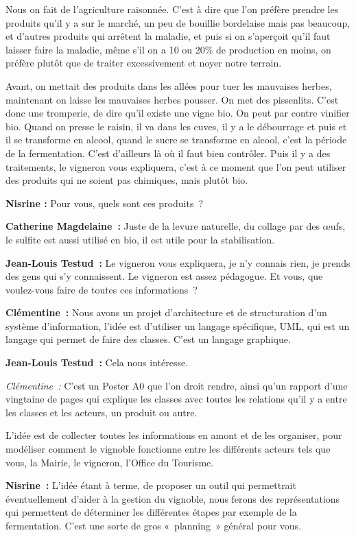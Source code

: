 \documentclass[a4paper, titlepage]{report}
\begin{document}
Nous on fait de l'agriculture raisonnée. C'est à dire que l'on préfère
prendre les produits qu'il y a sur le marché, un peu de bouillie
bordelaise mais pas beaucoup, et d'autres produits qui arrêtent la
maladie, et puis si on s'aperçoit qu'il faut laisser faire la maladie,
même s'il on a 10 ou 20\% de production en moins, on préfère plutôt que de traiter
excessivement et noyer notre terrain.

Avant, on mettait des produits dans les allées pour tuer les mauvaises
herbes, maintenant on laisse les mauvaises herbes pousser. On met des
pissenlits. C'est donc une tromperie, de dire qu'il existe une vigne
bio. On peut par contre vinifier bio. Quand on presse le raisin, il va
dans les cuves, il y a le débourrage et puis et il se transforme en
alcool, quand le sucre se transforme en alcool, c'est la période de la
fermentation. C'est d'ailleurs là où il faut bien contrôler. Puis il y a
des traitements, le vigneron vous expliquera, c'est à ce moment que l'on
peut utiliser des produits qui ne soient pas chimiques, mais plutôt bio.

\textbf{Nisrine :} Pour vous, quels sont ces produits~?

\textbf{Catherine Magdelaine~:} Juste de la levure naturelle, du collage
par des œufs, le sulfite est aussi utilisé en bio, il est utile pour la
stabilisation.

\textbf{Jean-Louis Testud~:} Le vigneron vous expliquera, je n'y connais
rien, je prends des gens qui s'y connaissent. Le vigneron est assez
pédagogue.
Et vous, que voulez-vous faire de toutes ces informations~?

\textbf{Clémentine~:} Nous avons un projet d'architecture et de
structuration d'un système d'information, l'idée est d'utiliser un
langage spécifique, UML, qui est un langage qui permet de faire des
classes. C'est un langage graphique.

\textbf{Jean-Louis Testud~:} Cela nous intéresse.

\emph{Clémentine~:} C'est un Poster A0 que l'on droit rendre, ainsi
qu'un rapport d'une vingtaine de pages qui explique les classes
avec toutes les relations qu'il y a entre les classes et les acteurs, un
produit ou autre.

L'idée est de collecter toutes les informations en amont et de les
organiser, pour modéliser comment le vignoble fonctionne entre les
différents acteurs tels que vous, la Mairie, le vigneron, l'Office du
Tourisme.

\textbf{Nisrine~:} L'idée étant à terme, de proposer un outil qui
permettrait éventuellement d'aider à la gestion du vignoble, nous ferons
des représentations qui permettent de déterminer les différentes étapes
par exemple de la fermentation. C'est une sorte de gros «~planning~»
général pour vous.
\end{document}
